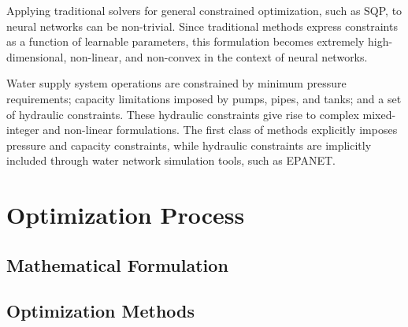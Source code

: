 Applying traditional solvers for general constrained optimization, such as SQP\cite{rfc18}, to neural networks can be non-trivial. Since traditional methods express constraints as a function of learnable parameters, this formulation becomes extremely high-dimensional, non-linear, and non-convex in the context of neural networks.\cite{rfc10}

Water supply system operations are constrained by minimum pressure requirements; capacity limitations imposed by pumps, pipes, and tanks; and a set of hydraulic constraints. These hydraulic constraints give rise to complex mixed-integer and non-linear formulations. The first class of methods explicitly imposes pressure and capacity constraints, while hydraulic constraints are implicitly included through water network simulation tools, such as EPANET.\cite{rfc17}

\section{Optimization Process}

\subsection{Mathematical Formulation}

\subsection{Optimization Methods}

